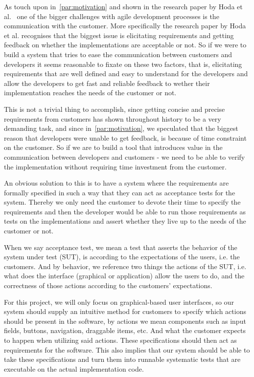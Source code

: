 As touch upon in~\autoref{par:motivation} and shown in the research paper by Hoda et al.~\cite{Hoda2011TheIO} one of the bigger challenges with agile development processes is the communication with the customer.
More specifically the research paper by Hoda et al. recognises that the biggest issue is elicitating requirements and getting feedback on whether the implementations are acceptable or not.
So if we were to build a system that tries to ease the communication between customers and developers it seems reasonable to fixate on these two factors, that is, elicitating requirements that are well defined and easy to understand for the developers and allow the developers to get fast and reliable feedback to wether their implementation reaches the needs of the customer or not.

This is not a trivial thing to accomplish, since getting concise and precise requirements from customers has shown throughout history to be a very demanding task, and since in~\autoref{par:motivation}, we speculated that the biggest reason that developers were unable to get feedback, is because of time constraint on the customer.
So if we are to build a tool that introduces value in the communication between developers and customers - we need to be able to verify the implementation without requiring time investment from the customer.

An obvious solution to this is to have a system where the requirements are formally specified in such a way that they can act as acceptance tests for the system.
Thereby we only need the customer to devote their time to specify the requirements and then the developer would be able to run those requirements as tests on the implementations and assert whether they live up to the needs of the customer or not.

When we say acceptance test, we mean a test that asserts the behavior of the system under test (SUT), is according to the expectations of the users, i.e. the customers.
And by behavior, we reference two things the actions of the SUT, i.e. what does the interface (graphical or application) allow the users to do, and the correctness of those actions according to the customers' expectations.

For this project, we will only focus on graphical-based user interfaces, so our system should supply an intuitive method for customers to specify which actions should be present in the software, by actions we mean components such as input fields, buttons, navigation, draggable items, etc.
And what the customer expects to happen when utilizing said actions.
These specifications should then act as requirements for the software.
This also implies that our system should be able to take these specifications and turn them into runnable systematic tests that are executable on the actual implementation code.

